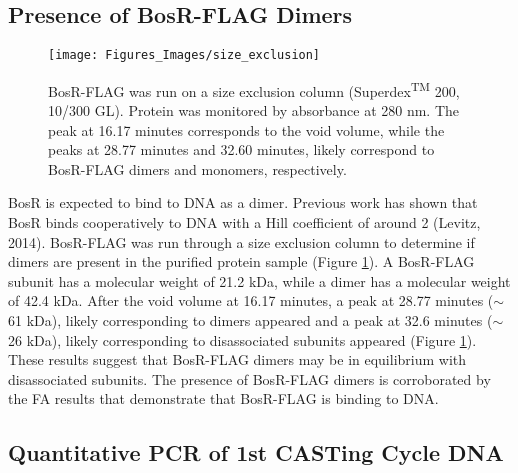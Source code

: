 \documentclass[12pt,twoside]{reedthesis}
\begin{document}
       \subsection{Presence of BosR-FLAG Dimers}
            \begin{figure}[h]
            	\centering
            	\texttt{[image: Figures\_Images/size\_exclusion]}
            	\caption[Size Exclusion Chromatography of BosR-FLAG]{BosR-FLAG was run on a size exclusion column (Superdex\textsuperscript{TM} 200, 10/300 GL). Protein was monitored by absorbance at 280 nm. The peak at 16.17 minutes corresponds to the void volume, while the peaks at 28.77 minutes and 32.60 minutes, likely correspond to BosR-FLAG dimers and monomers, respectively.}
            	\label{BosRFLAGSizeEx}
            \end{figure}
      
      BosR is expected to bind to DNA as a dimer. Previous work has shown that BosR binds cooperatively to DNA with a Hill coefficient of around 2 (Levitz, 2014). BosR-FLAG was run through a size exclusion column to determine if dimers are present in the purified protein sample (Figure \ref{BosRFLAGSizeEx}).  A BosR-FLAG subunit has a molecular weight of 21.2 kDa, while a dimer has a molecular weight of 42.4 kDa. After the void volume at 16.17 minutes, a peak at 28.77 minutes ($\sim$61 kDa), likely corresponding to dimers appeared and a peak at 32.6 minutes ($\sim$26 kDa), likely corresponding to disassociated subunits appeared (Figure \ref{BosRFLAGSizeEx}). These results suggest that BosR-FLAG dimers may be in equilibrium with disassociated subunits. The presence of BosR-FLAG dimers is corroborated by the FA results that demonstrate that BosR-FLAG is binding to DNA.   %
      
       \subsection{Quantitative PCR of 1st CASTing Cycle DNA}
       
\end{document}
